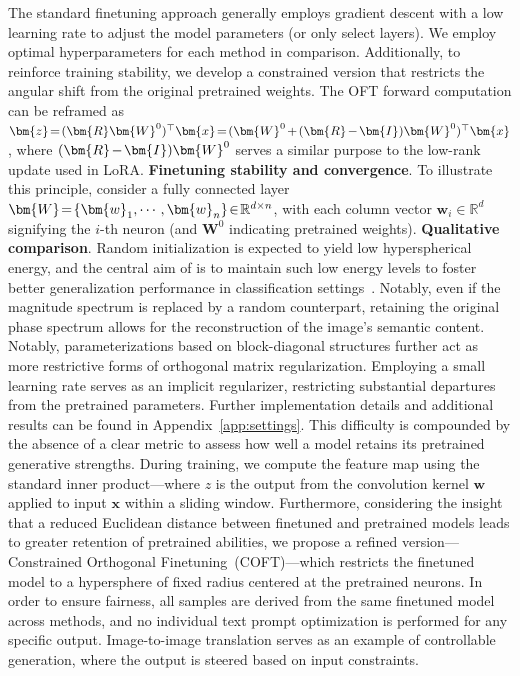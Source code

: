 The standard finetuning approach generally employs gradient descent with a low learning rate to adjust the model parameters (or only select layers). We employ optimal hyperparameters for each method in comparison. Additionally, to reinforce training stability, we develop a constrained version that restricts the angular shift from the original pretrained weights. The OFT forward computation can be reframed as $\thickmuskip=2mu \medmuskip=2mu \bm{z}=(\bm{R}\bm{W}^0)^\top\bm{x}=(\bm{W}^0+(\bm{R}-\bm{I})\bm{W}^0)^\top\bm{x}$, where $\thickmuskip=2mu \medmuskip=2mu (\bm{R}-\bm{I})\bm{W}^0$ serves a similar purpose to the low-rank update used in LoRA. \textbf{Finetuning stability and convergence}. To illustrate this principle, consider a fully connected layer $\thickmuskip=2mu \medmuskip=2mu \bm{W}=\{\bm{w}_1,\cdots,\bm{w}_n\}\in\mathbb{R}^{d\times n}$, with each column vector $\bm{w}_i\in\mathbb{R}^{d}$ signifying the $i$-th neuron (and $\bm{W}^0$ indicating pretrained weights). \textbf{Qualitative comparison}. Random initialization is expected to yield low hyperspherical energy, and the central aim of \cite{liu2021orthogonal} is to maintain such low energy levels to foster better generalization performance in classification settings~\cite{liu2018learning,lin2020regularizing}. Notably, even if the magnitude spectrum is replaced by a random counterpart, retaining the original phase spectrum allows for the reconstruction of the image's semantic content. Notably, parameterizations based on block-diagonal structures further act as more restrictive forms of orthogonal matrix regularization. Employing a small learning rate serves as an implicit regularizer, restricting substantial departures from the pretrained parameters. Further implementation details and additional results can be found in Appendix~\ref{app:settings}. This difficulty is compounded by the absence of a clear metric to assess how well a model retains its pretrained generative strengths. During training, we compute the feature map using the standard inner product—where $z$ is the output from the convolution kernel $\bm{w}$ applied to input $\bm{x}$ within a sliding window. Furthermore, considering the insight that a reduced Euclidean distance between finetuned and pretrained models leads to greater retention of pretrained abilities, we propose a refined version—Constrained Orthogonal Finetuning~(COFT)—which restricts the finetuned model to a hypersphere of fixed radius centered at the pretrained neurons. In order to ensure fairness, all samples are derived from the same finetuned model across methods, and no individual text prompt optimization is performed for any specific output. Image-to-image translation serves as an example of controllable generation, where the output is steered based on input constraints.